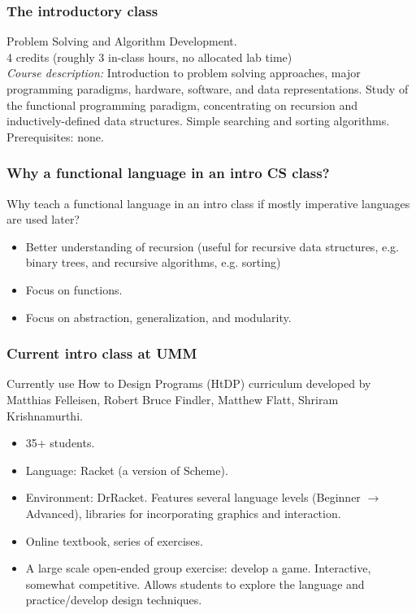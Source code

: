 \documentclass{beamer}
\begin{document}
\begin{frame}
  \frametitle{The introductory class}
Problem Solving and Algorithm Development. \\[1.2ex]

4 credits (roughly 3 in-class hours, no allocated lab time) \\[2ex]

{\it Course description: }Introduction to problem solving approaches, major programming paradigms, hardware, software, and data representations. Study of the functional programming paradigm, concentrating on recursion and inductively-defined data structures. Simple searching and sorting algorithms.
Prerequisites: none. 
\end{frame}

\begin{frame}
  \frametitle{Why a functional language in an intro CS class?}
Why teach a functional language in an intro class if mostly imperative languages are used later? 
\begin{itemize}
\item Better understanding of recursion (useful for recursive data structures, e.g. binary trees, and recursive algorithms, e.g. sorting)
\item Focus on functions.
\item Focus on abstraction, generalization, and modularity. 
\end{itemize}
\end{frame}


\begin{frame}
  \frametitle{Current intro class at UMM}
Currently use How to Design Programs (HtDP) curriculum developed by Matthias Felleisen, Robert Bruce Findler, Matthew Flatt, Shriram Krishnamurthi. 
\begin{itemize}
\item 35+ students. 
\item Language: Racket (a version of Scheme).
\item Environment: DrRacket. Features several language levels (Beginner $\to$ Advanced), libraries for incorporating graphics and interaction. 
\item Online textbook, series of exercises.
\item A large scale open-ended group exercise: develop a game. Interactive, somewhat competitive. Allows students to explore the language and practice/develop design techniques. 
\end{itemize}
\end{frame}
\end{document}
